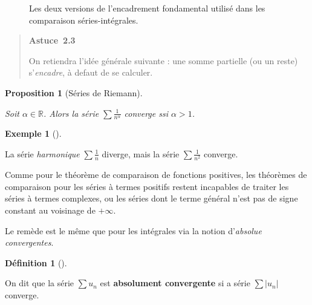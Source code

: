 \documentclass[
  french,
  letterpaper,
  DIV=11,
  numbers=noendperiod]{scrreprt}
\theoremstyle{plain}
\theoremstyle{definition}
\newtheorem{definition}{Définition}[chapter]
\theoremstyle{plain}
\newtheorem{proposition}{Proposition}[chapter]
\theoremstyle{plain}
\theoremstyle{definition}
\theoremstyle{definition}
\newtheorem{example}{Exemple}[chapter]
\theoremstyle{plain}
\theoremstyle{remark}
\begin{document}
\begin{tcolorbox}
\begin{figure}[H]
\begin{minipage}[t]{0.50\linewidth}
{}

\end{minipage}%

\caption{\label{fig-encadrement}Les deux versions de l'encadrement
fondamental utilisé dans les comparaison séries-intégrales.}

\end{figure}%

\protect{}\label{tip-encadrement}
\begin{quote}
\textbf{Astuce~2.3}

On retiendra l'idée générale suivante : une somme partielle (ou un
reste) s'\emph{encadre}, à defaut de se calculer.
\end{quote}

\end{tcolorbox}

\begin{proposition}[Séries de
Riemann]\protect\hypertarget{prp-serie-riemann}{}\label{prp-serie-riemann}

Soit \(\alpha \in \mathbb{R}\). Alors la série
\(\sum \frac{1}{n^{\alpha}}\) converge ssi \(\alpha>1\).

\end{proposition}

\begin{example}[]\protect\hypertarget{exm-harmonique}{}\label{exm-harmonique}

La série \emph{harmonique} \(\sum \frac{1}{n}\) diverge, mais la série
\(\sum
\frac{1}{n^{2}}\) converge.

\end{example}

Comme pour le théorème de comparaison de fonctions positives, les
théorèmes de comparaison pour les séries à termes positifs restent
incapables de traiter les séries à termes complexes, ou les séries dont
le terme général n'est pas de signe constant au voisinage de
\(+\infty\).

Le remède est le même que pour les intégrales via la notion
d'\emph{absolue convergentes}.

\begin{definition}[]\protect\hypertarget{def-serie-absolument-convergente}{}\label{def-serie-absolument-convergente}

On dit que la série \(\sum u_{n}\) est \textbf{absolument convergente}
si a série \(\sum |u_{n}|\) converge.

\end{definition}
\end{document}
